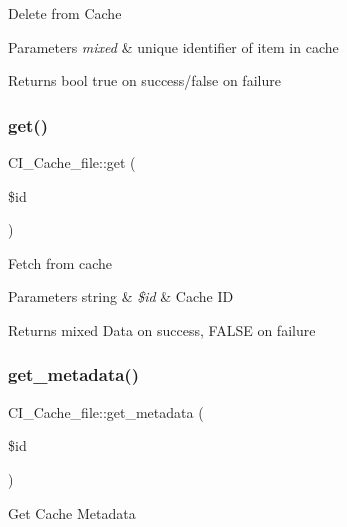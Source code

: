 Delete from Cache


\begin{DoxyParams}{Parameters}
{\em mixed} & unique identifier of item in cache \\
\hline
\end{DoxyParams}
\begin{DoxyReturn}{Returns}
bool true on success/false on failure 
\end{DoxyReturn}
\mbox{\label{class_c_i___cache__file_ad3be8908694264efcf394acf1025d27b}} 
\subsubsection{\texorpdfstring{get()}{get()}}
{\footnotesize\ttfamily C\+I\+\_\+\+Cache\+\_\+file\+::get (\begin{DoxyParamCaption}\item[{}]{\$id }\end{DoxyParamCaption})}

Fetch from cache


\begin{DoxyParams}[1]{Parameters}
string & {\em \$id} & Cache ID \\
\hline
\end{DoxyParams}
\begin{DoxyReturn}{Returns}
mixed Data on success, F\+A\+L\+SE on failure 
\end{DoxyReturn}
\mbox{\label{class_c_i___cache__file_a3c2223ea43cd7fa6dc45f7d31120a7b3}} 
\subsubsection{\texorpdfstring{get\+\_\+metadata()}{get\_metadata()}}
{\footnotesize\ttfamily C\+I\+\_\+\+Cache\+\_\+file\+::get\+\_\+metadata (\begin{DoxyParamCaption}\item[{}]{\$id }\end{DoxyParamCaption})}

Get Cache Metadata


